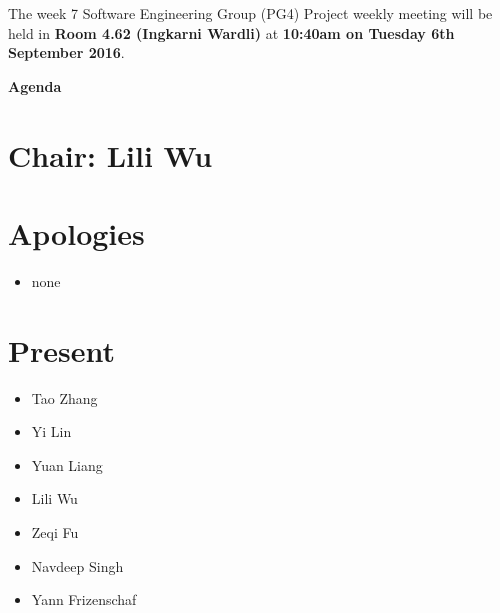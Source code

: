 \documentclass[11pt, a4paper]{article}
\begin{document}

\noindent The week 7 Software Engineering Group (PG4) Project weekly meeting will be held in {\bf Room 4.62 (Ingkarni Wardli)} at {\bf 10:40am on Tuesday 6th September 2016}.



\vspace*{15pt}

\begin{center}

\huge \bf Agenda

\end{center}




\section*{Chair: Lili Wu}

\vspace*{10pt}




\section{Apologies}

\begin{itemize}

\item none

\end{itemize}




\section{Present}

\begin{itemize}

\item Tao Zhang

\item Yi Lin

\item Yuan Liang

\item Lili Wu

\item Zeqi Fu

\item Navdeep Singh

\item Yann Frizenschaf

\end{itemize}
\end{document}
